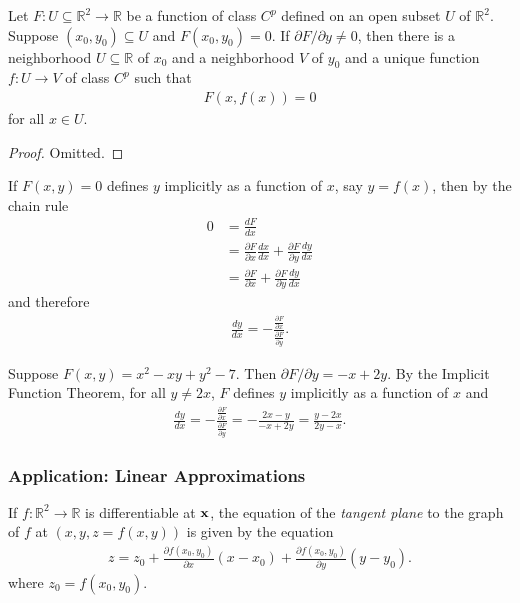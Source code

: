 \documentclass[12pt,letterpaper,reqno]{article}
\numberwithin{equation}{section}
\newcommand{\R}{\ensuremath{\mathbb R}}
\newcommand{\bx}{{\bf x}}
\begin{document}
{\begin{thm}
	Let $F:U \subseteq \R^2 \to \R$ be a function of class $C^p$ defined on an open subset $U$ of $\R^2$. Suppose $(x_0,y_0) \subseteq U$ and $F(x_0,y_0)=0$. If $\partial F/\partial y \neq 0$, then there is a neighborhood $U \subseteq \R$ of $x_0$ and a neighborhood $V$ of $y_0$ and a unique function $f:U \to V$ of class $C^p$ such that 
	\begin{align*}
		F(x,f(x))=0
	\end{align*}
	for all $x \in U$. 
\end{thm}

\begin{proof}
	Omitted.
\end{proof}

If $F(x,y)=0$ defines $y$ implicitly as a function of $x$, say $y=f(x)$, then by the chain rule
\begin{align*}
	0&=\frac{d F}{d x} \\
	&=\frac{\partial F}{\partial x}\frac{dx}{dx}+ \frac{\partial F}{\partial y}\frac{dy}{dx}\\
	&=\frac{\partial F}{\partial x}+ \frac{\partial F}{\partial y}\frac{dy}{dx}
\end{align*}
and therefore
\begin{align*}
	\frac{dy}{dx}=-\frac{\frac{\partial F}{\partial x}}{\frac{\partial F}{\partial y}}.
\end{align*}

\begin{example}
Suppose $F(x,y)=x^2-xy+y^2-7$. Then $\partial F/\partial y=-x+2y$. By the Implicit Function Theorem, for all $y \neq 2x$, $F$ defines $y$ implicitly as a function of $x$ and 
\begin{align*}
	\frac{dy}{dx}=-\frac{\frac{\partial F}{\partial x}}{\frac{\partial F}{\partial y}}=-\frac{2x-y}{-x+2y}=\frac{y-2x}{2y-x}.
\end{align*}
\end{example}




\subsubsection{Application: Linear Approximations}
If $f:\R^2 \to \R$ is differentiable at $\bx$, the equation of the \emph{tangent plane} to the graph of $f$ at $(x,y,z=f(x,y))$ is given by the equation
\begin{align*}
	z=z_0+\frac{\partial f(x_0,y_0)}{\partial x}(x-x_0)+\frac{\partial f(x_0,y_0)}{\partial y}(y-y_0).
\end{align*}
where $z_0=f(x_0,y_0)$.

}
\end{document}
